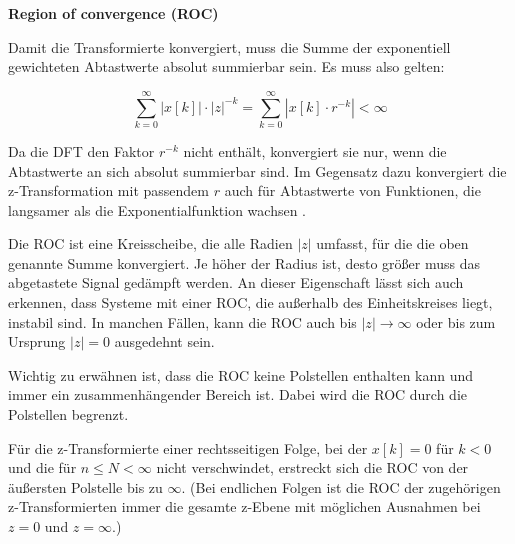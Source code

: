 
\addvspace{1cm}
\textbf{Region of convergence (ROC)}

Damit die Transformierte konvergiert, muss die Summe der exponentiell gewichteten Abtastwerte absolut summierbar sein. Es muss also gelten:

\begin{equation}
    \sum_{k=0}^{\infty} |x[k]| \cdot |z|^{-k} = \sum_{k=0}^{\infty} |x[k] \cdot r^{-k}| < \infty
    \label{eq:absKonvergenz}
\end{equation}

Da die DFT den Faktor $r^{-k}$ nicht enthält, konvergiert sie nur, wenn die Abtastwerte an sich absolut summierbar sind. Im Gegensatz dazu konvergiert die z-Transformation mit passendem $r$ auch für Abtastwerte von Funktionen, die langsamer als die Exponentialfunktion wachsen \cite[S.182]{book3}.

Die ROC ist eine Kreisscheibe, die alle Radien $|z|$ umfasst, für die die oben genannte Summe konvergiert. Je höher der Radius ist, desto größer muss das abgetastete Signal gedämpft werden. An dieser Eigenschaft lässt sich auch erkennen, dass Systeme mit einer ROC, die außerhalb des Einheitskreises liegt, instabil sind.
In manchen Fällen, kann die ROC auch bis $|z| \rightarrow  \infty$ oder bis zum Ursprung $|z|=0$ ausgedehnt sein.

Wichtig zu erwähnen ist, dass die ROC keine Polstellen enthalten kann und immer ein zusammenhängender Bereich ist. Dabei wird die ROC durch die Polstellen begrenzt.

Für die z-Transformierte einer rechtsseitigen Folge, bei der $x[k] = 0$ für $k<0$ und die für $n \leq N < \infty$ nicht verschwindet, erstreckt sich die ROC von der äußersten Polstelle bis zu $\infty$.
(Bei endlichen Folgen ist die ROC der zugehörigen z-Transformierten immer die gesamte z-Ebene mit möglichen Ausnahmen bei $z=0$ und $z=\infty$.) \cite[S.191]{book3}

